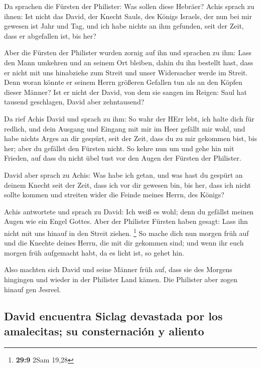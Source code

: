  Da sprachen die Fürsten der Philister: Was sollen diese
Hebräer? Achis sprach zu ihnen: Ist nicht das David, der Knecht Sauls,
des Königs Israels, der nun bei mir gewesen ist Jahr und Tag, und ich
habe nichts an ihm gefunden, seit der Zeit, dass er abgefallen ist, bis
her?

 Aber die Fürsten der Philister wurden zornig auf ihn und
sprachen zu ihm: Lass den Mann umkehren und an seinem Ort bleiben, dahin
du ihn bestellt hast, dass er nicht mit uns hinabziehe zum Streit und
unser Widersacher werde im Streit. Denn woran könnte er seinem Herrn
größeren Gefallen tun als an den Köpfen dieser Männer? 
Ist er nicht der David, von dem sie sangen im Reigen: Saul hat tausend
geschlagen, David aber zehntausend?

 Da rief Achis David und sprach zu ihm: So wahr der HErr
lebt, ich halte dich für redlich, und dein Ausgang und Eingang mit mir
im Heer gefällt mir wohl, und habe nichts Arges an dir gespürt, seit der
Zeit, dass du zu mir gekommen bist, bis her; aber du gefällst den
Fürsten nicht.  So kehre nun um und gehe hin mit Frieden,
auf dass du nicht übel tust vor den Augen der Fürsten der Philister.

 David aber sprach zu Achis: Was habe ich getan, und was
hast du gespürt an deinem Knecht seit der Zeit, dass ich vor dir gewesen
bin, bis her, dass ich nicht sollte kommen und streiten wider die Feinde
meines Herrn, des Königs?

 Achis antwortete und sprach zu David: Ich weiß es wohl;
denn du gefällst meinen Augen wie ein Engel Gottes. Aber der Philister
Fürsten haben gesagt: Lass ihn nicht mit uns hinauf in den Streit
ziehen. \footnote{\textbf{29:9} 2Sam 19,28}  So mache
dich nun morgen früh auf und die Knechte deines Herrn, die mit dir
gekommen sind; und wenn ihr euch morgen früh aufgemacht habt, da es
licht ist, so gehet hin.

 Also machten sich David und seine Männer früh auf, dass
sie des Morgens hingingen und wieder in der Philister Land kämen. Die
Philister aber zogen hinauf gen Jesreel.

\hypertarget{david-encuentra-siclag-devastada-por-los-amalecitas-su-consternaciuxf3n-y-aliento}{%
\subsection{David encuentra Siclag devastada por los amalecitas; su
consternación y
aliento}\label{david-encuentra-siclag-devastada-por-los-amalecitas-su-consternaciuxf3n-y-aliento}}

